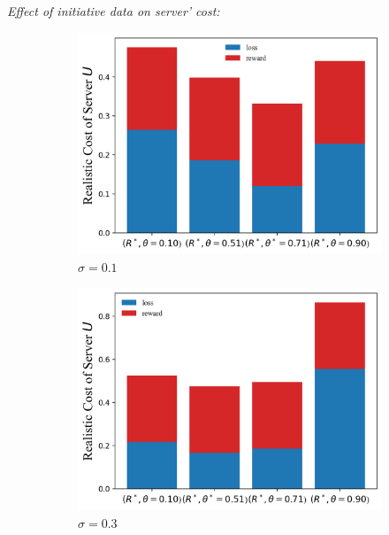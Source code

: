 \documentclass{article}
\theoremstyle{plain}
\theoremstyle{definition}
\theoremstyle{remark}
\begin{document}
\textit{Effect of initiative data on server' cost:}
\begin{figure}
	\begin{subfigure}{0.31\textwidth}
		\centering
    \includegraphics[width=\textwidth]{figures/figure_66_A.png}
    \caption{$\sigma=0.1$}
	\end{subfigure}
  \quad
	\begin{subfigure}{0.31\textwidth}
		\centering
		\includegraphics[width=\textwidth]{figures/figure_66_B.png}
    \caption{$\sigma=0.3$}
	\end{subfigure}
  \quad
  \begin{subfigure}{0.31\textwidth}
		\centering

\end{subfigure}
\end{figure}
\end{document}
